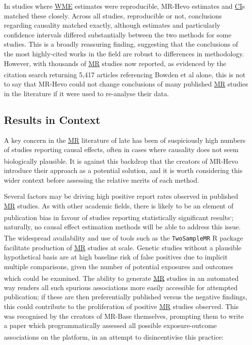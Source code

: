 \documentclass[
]{article}
\begin{document}
In studies where \hyperref[acronyms_WME]{WME} estimates were reproducible, MR-Hevo estimates and \hyperref[acronyms_CI]{CI}s matched these closely. Across all studies, reproducible or not, conclusions regarding causality matched exactly, although estimates and particularly confidence intervals differed substantially between the two methods for some studies. This is a broadly reassuring finding, suggesting that the conclusions of the most highly-cited works in the field are robust to differences in methodology. However, with thousands of \hyperref[acronyms_MR]{MR} studies now reported, as evidenced by the citation search returning 5,417 articles referencing Bowden et al\textsuperscript{} alone, this is not to say that MR-Hevo could not change conclusions of many published \hyperref[acronyms_MR]{MR} studies in the literature if it were used to re-analyse their data.

\subsection{Results in Context}\label{results-in-context}

A key concern in the \hyperref[acronyms_MR]{MR} literature of late has been of suspiciously high numbers of studies reporting causal effects, often in cases where causality does not seem biologically plausible\textsuperscript{}. It is against this backdrop that the creators of MR-Hevo introduce their approach as a potential solution, and it is worth considering this wider context before assessing the relative merits of each method.

Several factors may be driving high positive report rates observed in published \hyperref[acronyms_MR]{MR} studies. As with other academic fields, there is likely to be an element of publication bias in favour of studies reporting statistically significant results\textsuperscript{,}; naturally, no causal effect estimation methods will be able to address this issue. The widespread availability and use of tools such as the \texttt{TwoSampleMR} R package\textsuperscript{} facilitate production of \hyperref[acronyms_MR]{MR} studies at scale. Genetic studies without a plausible hypothetical basis are at high baseline risk of false positives due to implicit multiple comparisons, given the number of potential exposures and outcomes which could be examined\textsuperscript{}. The ability to generate \hyperref[acronyms_MR]{MR} studies in an automated way renders all such spurious associations more easily accessible for attempted publication; if these are then preferentially published versus the negative findings, this could contribute to the proliferation of positive \hyperref[acronyms_MR]{MR} studies observed. This was recognised by the creators of MR-Base themselves, prompting them to write a paper which programmatically assessed all possible exposure-outcome associations on the platform, in an attempt to disincentivise this practice\textsuperscript{}:
\end{document}
